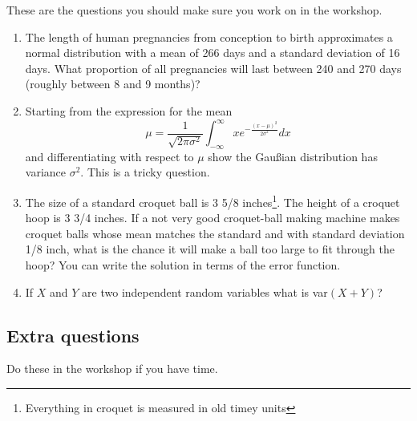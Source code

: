 \documentclass[11pt,a4paper]{scrartcl}
\begin{document}
These are the questions you should make sure you work on in the workshop.

\begin{enumerate}



\item The length of human pregnancies from conception to birth
  approximates a normal distribution with a mean of 266 days and a
  standard deviation of 16 days.  What proportion of all pregnancies
  will last between 240 and 270 days (roughly between 8 and 9 months)?
  
\item Starting from the expression for the mean
  \begin{equation}
    \mu=\frac{1}{\sqrt{2\pi\sigma^2}}\int_{-\infty}^\infty xe^{-\frac{(x-\mu)^2}{2\sigma^2}}dx
  \end{equation}
  and differentiating with respect to $\mu$ show the Gau\ss{}ian
  distribution has variance $\sigma^2$. This is a tricky question.

\item The size of a standard croquet ball is 3 5/8
  inches\footnote{Everything in croquet is measured in old timey
    units}. The height of a croquet hoop is 3 3/4 inches. If a not
  very good croquet-ball making machine makes croquet balls whose mean
  matches the standard and with standard deviation 1/8 inch, what is
  the chance it will make a ball too large to fit through the hoop?
  You can write the solution in terms of the error function.

 \item If $X$ and $Y$ are two independent random variables what is var$(X+Y)$?
  

\end{enumerate}

\subsection*{Extra questions}

Do these in the workshop if you have time.
\end{document}
